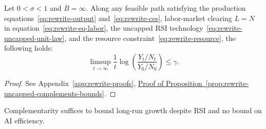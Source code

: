 \begin{proposition}
\label{prop:rewrite-uncapped-complements-bounds}
Let $0<\sigma<1$ and $\overline B=\infty$.
Along any feasible path satisfying the production equations~\eqref{eq:rewrite-output}
and~\eqref{eq:rewrite-ces}, labor-market clearing $L=N$ in
equation~\eqref{eq:rewrite-eq-labor}, the uncapped RSI technology~\eqref{eq:rewrite-uncapped-unit-law},
and the resource constraint~\eqref{eq:rewrite-resource}, the following holds:
\begin{equation}
 \limsup_{t\to\infty}\frac1t
 \log\left(\frac{Y_t/N_t}{Y_0/N_0}\right)\leq\gamma.
 \label{eq:rewrite-uncapped-complements-growth-bound}
\end{equation}
\end{proposition}
\begin{proof}
See Appendix~\ref{app:rewrite-proofs},
\hyperref[proof:rewrite-uncapped-complements-bounds]{Proof of
Proposition~\ref*{prop:rewrite-uncapped-complements-bounds}}.
\end{proof}

Complementarity suffices to bound long-run growth despite RSI and no bound on AI efficiency.



